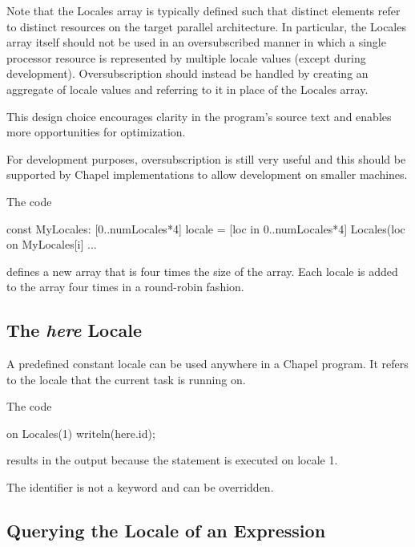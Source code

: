 Note that the Locales array is typically defined such that distinct
elements refer to distinct resources on the target parallel
architecture.  In particular, the Locales array itself should not be
used in an oversubscribed manner in which a single processor resource
is represented by multiple locale values (except during development).
Oversubscription should instead be handled by creating an aggregate of
locale values and referring to it in place of the Locales array.

\begin{rationale}
This design choice encourages clarity in the program's source text and
enables more opportunities for optimization.

For development purposes, oversubscription is still very useful and
this should be supported by Chapel implementations to allow
development on smaller machines.
\end{rationale}

\begin{example}
The code
\begin{chapel}
const MyLocales: [0..numLocales*4] locale 
               = [loc in 0..numLocales*4] Locales(loc%
on MyLocales[i] ...
\end{chapel}
defines a new array  that is four times the size of
the  array.  Each locale is added to
the  array four times in a round-robin fashion.
\end{example}

\subsection{The {\em here} Locale}
\label{here}

A predefined constant locale  can be used anywhere in a
Chapel program.  It refers to the locale that the current task is
running on.

\begin{example}
The code
\begin{chapel}
on Locales(1) {
  writeln(here.id);
}
\end{chapel}
results in the output  because the  statement is
executed on locale 1.
\end{example}

The identifier  is not a keyword and can be overridden.

\subsection{Querying the Locale of an Expression}
\label{Querying_the_Locale_of_a_Variable}

